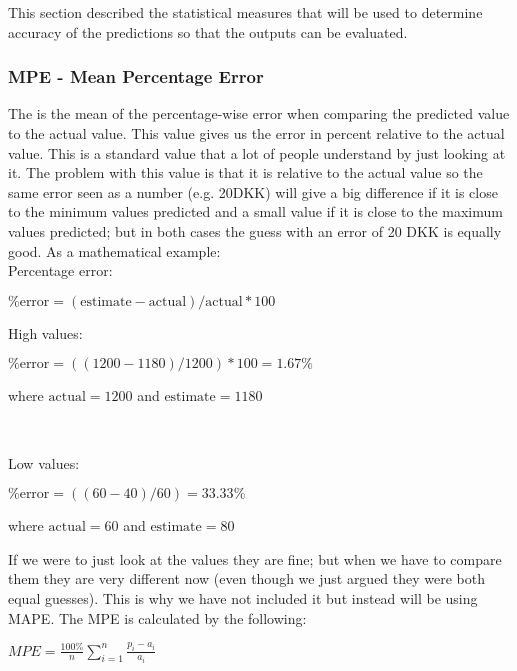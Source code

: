 This section described the statistical measures that will be used to determine accuracy of the predictions so that the outputs can be evaluated.

\subsubsection{MPE - Mean Percentage Error}
The  is the mean of the percentage-wise error when comparing the predicted value to the actual value. This value gives us the error in percent relative to the actual value. This is a standard value that a lot of people understand by just looking at it. The problem with this value is that it is relative to the actual value so the same error seen as a number (e.g. 20DKK) will give a big difference if it is close to the minimum values predicted and a small value if it is close to the maximum values predicted; but in both cases the guess with an error of 20 DKK is equally good. As a mathematical example:
\\[0.5cm]
\noindent Percentage error:
\begin{center}
$\text{\% error} = (\text{estimate} - \text{actual}) / \text{actual} * 100$
\end{center}
\begin{minipage}{\textwidth}
\noindent High values:
\begin{center}
$\text{\% error} = ((1200-1180)/1200)*100 = 1.67\%$
\end{center}
\noindent where $\text{actual} = 1200$ and $\text{estimate} = 1180$
\end{minipage}
\\[0.5cm]
\begin{minipage}{\textwidth}
\noindent Low values: 
\begin{center}
$\text{\% error} = ((60-40)/60) = 33.33\%$
\end{center}
\noindent where $\text{actual} = 60$ and $\text{estimate} = 80$
\\[0.5cm]
\end{minipage}
\noindent If we were to just look at the values they are fine; but when we have to compare them they are very different now (even though we just argued they were both equal guesses). This is why we have not included it but instead will be using MAPE.
The MPE is calculated by the following:
\begin{center}
$ MPE = \frac{100\%}{n}\sum_{i=1}^{n}\frac{p_i - a_i}{a_i} $
\end{center}

